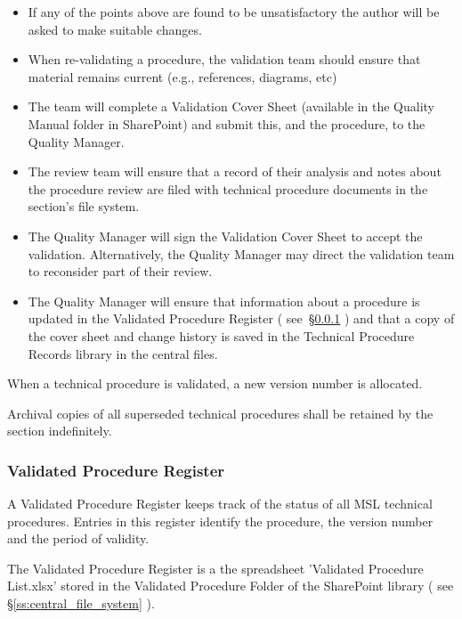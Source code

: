 \begin{itemize}
\begin{itemize}
\item there is a suggested re-validation interval (no more than 5 years)
\item all staff identified in the TCM in respect to the procedure (i.e., author, worker, etc) have maintained the relevant competency
\end{itemize}
\item If any of the points above are found to be unsatisfactory the author will be asked to make suitable changes.
\item When re-validating a procedure, the validation team should ensure that material remains current (e.g., references, diagrams, etc)
\item The team will complete a Validation Cover Sheet (available in the Quality Manual folder in SharePoint) and submit this, and the procedure, to the Quality Manager. 
\item The review team will ensure that a record of their analysis and notes about the procedure review are filed with technical procedure documents in the section’s file system. 
\item The Quality Manager will sign the Validation Cover Sheet to accept the validation. Alternatively, the Quality Manager may direct the validation team to reconsider part of their review.
\item The Quality Manager will ensure that information about a procedure is updated in the Validated Procedure Register ( see~\S\ref{sss:validated_procedure_register} ) and that a copy of the cover sheet and change history is saved in the Technical Procedure Records library in the central files.
\end{itemize}

When a technical procedure is validated, a new version number is allocated. 

Archival copies of all superseded technical procedures shall be retained by the section indefinitely.

\subsubsection{Validated Procedure Register}
\label{sss:validated_procedure_register}
A Validated Procedure Register keeps track of the status of all MSL technical procedures. Entries in this register identify the procedure, the version number and the period of validity.

The Validated Procedure Register is a the spreadsheet 'Validated Procedure List.xlsx' stored in the Validated Procedure Folder of the SharePoint library ( see \S\ref{ss:central_file_system} ). 

